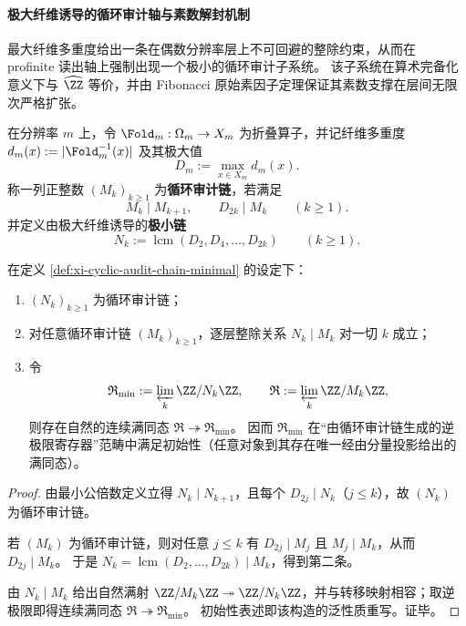 \paragraph{极大纤维诱导的循环审计轴与素数解封机制}
最大纤维多重度给出一条在偶数分辨率层上不可回避的整除约束，从而在 profinite 读出轴上强制出现一个极小的循环审计子系统。
该子系统在算术完备化意义下与 \(\widehat{\ZZ}\) 等价，并由 Fibonacci 原始素因子定理保证其素数支撑在层间无限次严格扩张。

\begin{definition}[循环审计链与极小链]\label{def:xi-cyclic-audit-chain-minimal}
在分辨率 \(m\) 上，令 \(\Fold_m:\Omega_m\to X_m\) 为折叠算子，并记纤维多重度
\(
d_m(x):=|\Fold_m^{-1}(x)|
\)
及其极大值
\[
D_m:=\max_{x\in X_m} d_m(x).
\]
称一列正整数 \((M_k)_{k\ge 1}\) 为\textbf{循环审计链}，若满足
\[
M_k\mid M_{k+1},
\qquad
D_{2k}\mid M_k
\qquad(k\ge 1).
\]
并定义由极大纤维诱导的\textbf{极小链}
\[
N_k:=\operatorname{lcm}(D_2,D_4,\dots,D_{2k})
\qquad(k\ge 1).
\]
\end{definition}

\begin{theorem}[极小循环审计链与其泛性质]\label{thm:xi-minimal-cyclic-audit-chain-universal}
在定义 \ref{def:xi-cyclic-audit-chain-minimal} 的设定下：
\begin{enumerate}
  \item \((N_k)_{k\ge 1}\) 为循环审计链；
  \item 对任意循环审计链 \((M_k)_{k\ge 1}\)，逐层整除关系 \(N_k\mid M_k\) 对一切 \(k\) 成立；
  \item 令
  \[
  \mathfrak R_{\min}:=\varprojlim_{k}\ZZ/N_k\ZZ,
  \qquad
  \mathfrak R:=\varprojlim_{k}\ZZ/M_k\ZZ,
  \]
  则存在自然的连续满同态 \(\mathfrak R\twoheadrightarrow\mathfrak R_{\min}\)。
  因而 \(\mathfrak R_{\min}\) 在“由循环审计链生成的逆极限寄存器”范畴中满足初始性（任意对象到其存在唯一经由分量投影给出的满同态）。
\end{enumerate}
\end{theorem}
\begin{proof}
由最小公倍数定义立得 \(N_k\mid N_{k+1}\)，且每个 \(D_{2j}\mid N_k\)（\(j\le k\)），故 \((N_k)\) 为循环审计链。

若 \((M_k)\) 为循环审计链，则对任意 \(j\le k\) 有 \(D_{2j}\mid M_j\) 且 \(M_j\mid M_k\)，从而 \(D_{2j}\mid M_k\)。
于是 \(N_k=\operatorname{lcm}(D_2,\dots,D_{2k})\mid M_k\)，得到第二条。

由 \(N_k\mid M_k\) 给出自然满射 \(\ZZ/M_k\ZZ\twoheadrightarrow\ZZ/N_k\ZZ\)，并与转移映射相容；取逆极限即得连续满同态 \(\mathfrak R\twoheadrightarrow\mathfrak R_{\min}\)。
初始性表述即该构造的泛性质重写。证毕。
\end{proof}

